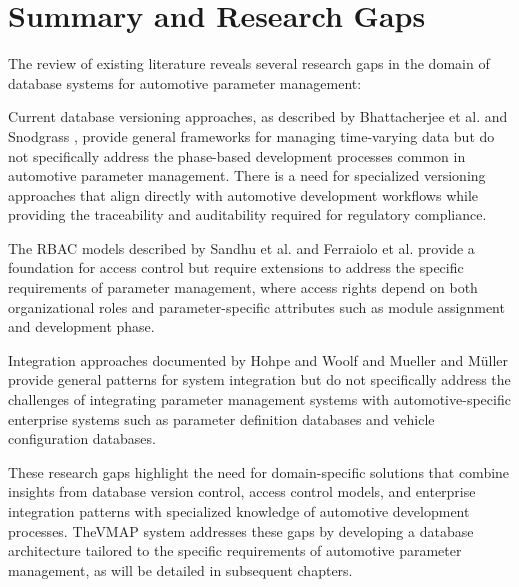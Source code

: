 \section{Summary and Research Gaps}
\label{sec:summary-gaps}

The review of existing literature reveals several research gaps in the domain of database systems for automotive parameter management:

Current database versioning approaches, as described by Bhattacherjee et al. \cite{bhattacherjee2015principles} and Snodgrass \cite{snodgrass1999developing}, provide general frameworks for managing time-varying data but do not specifically address the phase-based development processes common in automotive parameter management. There is a need for specialized versioning approaches that align directly with automotive development workflows while providing the traceability and auditability required for regulatory compliance.

The \ac{RBAC} models described by Sandhu et al. \cite{sandhu1998role} and Ferraiolo et al. \cite{ferraiolo2011policy} provide a foundation for access control but require extensions to address the specific requirements of parameter management, where access rights depend on both organizational roles and parameter-specific attributes such as module assignment and development phase.

Integration approaches documented by Hohpe and Woolf \cite{hohpe2002enterprise} and Mueller and Müller \cite{mueller2018conception} provide general patterns for system integration but do not specifically address the challenges of integrating parameter management systems with automotive-specific enterprise systems such as parameter definition databases and vehicle configuration databases.

These research gaps highlight the need for domain-specific solutions that combine insights from database version control, access control models, and enterprise integration patterns with specialized knowledge of automotive development processes. The\ac{VMAP} system addresses these gaps by developing a database architecture tailored to the specific requirements of automotive parameter management, as will be detailed in subsequent chapters.